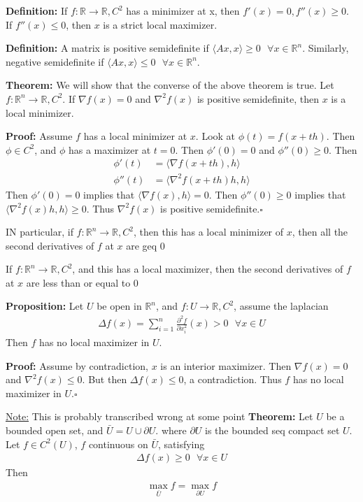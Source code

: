 \documentclass{article}
\newcommand*{\qed}{\hfill$\square$}%
\newcommand*{\txt}[1]{\text{ #1 }}%
\newcommand*{\iprod}[1]{\langle #1 \rangle}
\newcommand*{\fora}{\txt{}\forall}%
\newcommand*{\rr}{\mathbb{R}}%
\begin{document}
\textbf{Definition:} If $f:\rr\to \rr, C^2$ has a minimizer at x, then $f'(x)=0, f''(x)\geq 0$. If $f''(x)\leq 0$, then $x$ is a strict local maximizer.

\textbf{Definition:} A matrix is positive semidefinite if $\iprod{Ax,x}\geq 0\fora x\in \rr^n$. Similarly, negative semidefinite if $\iprod{Ax,x}\leq 0\fora x\in \rr^n$.

\textbf{Theorem:} We will show that the converse of the above theorem is true. Let $f:\rr^n\to \rr, C^2$. If $\nabla f(x)=0$ and $\nabla^2 f(x)$ is positive semidefinite, then $x$ is a local minimizer.

\textbf{Proof:} Assume $f$ has a local minimizer at $x$. Look at $\phi(t)=f(x+th)$. Then $\phi\in C^2$, and $\phi$ has a maximizer at $t=0$. Then $\phi'(0)=0$ and $\phi''(0)\geq 0$. Then \begin{align*}
    \phi'(t)&=\iprod{\nabla f(x+th),h}\\
    \phi''(t)&=\iprod{\nabla^2 f(x+th)h,h}
\end{align*} Then $\phi'(0)=0$ implies that $\iprod{\nabla f(x),h}=0$. Then $\phi''(0)\geq 0$ implies that $\iprod{\nabla^2 f(x)h,h}\geq 0$. Thus $\nabla^2 f(x)$ is positive semidefinite.\qed

IN particular, if $f:\rr^n\to \rr, C^2$, then this has a local minimizer of $x$, then all the second derivatives of $f$ at $x$ are geq 0

If $f:\rr^n\to \rr, C^2$, and this has a local maximizer, then the second derivatives of $f$ at $x$ are less than or equal to 0

\textbf{Proposition:} Let $U$ be open in $\rr^n$, and $f:U\to \rr, C^2$, assume the laplacian \begin{align*}
    \Delta f(x)=\sum_{i=1}^{n}\frac{\partial^2 f}{\partial x_i^2}(x)>0 \fora x\in U
\end{align*} Then $f$ has no local maximizer in $U$.

\textbf{Proof:} Assume by contradiction, $x$ is an interior maximizer. Then $\nabla f(x)=0$ and $\nabla^2 f(x)\leq 0$. But then $\Delta f(x)\leq 0$, a contradiction. Thus $f$ has no local maximizer in $U$.\qed 


\underline{Note:} This is probably transcribed wrong at some point
\textbf{Theorem:} Let $U$ be a bounded open set, and $\bar{U}=U\cup \partial U$. where $\partial U$ is the bounded seq compact set $U$. Let $f\in C^2(U)$, $f$ continuous on $\bar{U}$, satisfying \begin{align*}
    \Delta f(x)\geq 0 \fora x\in U
\end{align*} Then \begin{align*}
    \max_{\bar{U}}f=\max_{\partial U}f
\end{align*}
\end{document}
